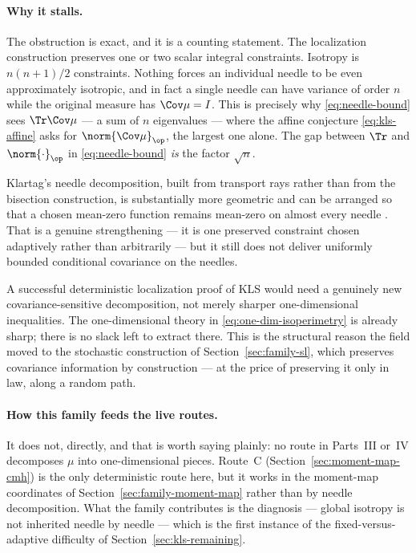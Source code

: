 \documentclass[../../main.tex]{subfiles}
\begin{document}
\paragraph{Why it stalls.}
The obstruction is exact, and it is a counting statement. The localization construction preserves
one or two scalar integral constraints. Isotropy is $n(n+1)/2$ constraints. Nothing forces an
individual needle to be even approximately isotropic, and in fact a single needle can have
variance of order $n$ while the original measure has $\Cov\mu=I$. This is precisely why
\eqref{eq:needle-bound} sees $\Tr\Cov\mu$ --- a sum of $n$ eigenvalues --- where the affine
conjecture \eqref{eq:kls-affine} asks for $\norm{\Cov\mu}_\op$, the largest one alone. The gap
between $\Tr$ and $\norm{\cdot}_\op$ in \eqref{eq:needle-bound} \emph{is} the factor $\sqrt n$.

Klartag's needle decomposition, built from transport rays rather than from the bisection
construction, is substantially more geometric and can be arranged so that a chosen mean-zero
function remains mean-zero on almost every needle \cite{Klartag2014Needle}. That is a genuine
strengthening --- it is one preserved constraint chosen adaptively rather than arbitrarily --- but
it still does not deliver uniformly bounded conditional covariance on the needles.

\begin{remark}
\label{rem:needle-requirement}
A successful deterministic localization proof of KLS would need a genuinely new
covariance-sensitive decomposition, not merely sharper one-dimensional inequalities. The
one-dimensional theory in \eqref{eq:one-dim-isoperimetry} is already sharp; there is no slack left
to extract there. This is the structural reason the field moved to the stochastic construction of
Section~\ref{sec:family-sl}, which preserves covariance information by construction --- at the
price of preserving it only in law, along a random path.
\end{remark}

\paragraph{How this family feeds the live routes.}
It does not, directly, and that is worth saying plainly: no route in Parts~III or~IV decomposes
$\mu$ into one-dimensional pieces. Route~C (Section~\ref{sec:moment-map-cmh}) is the only
deterministic route here, but it works in the moment-map coordinates of
Section~\ref{sec:family-moment-map} rather than by needle decomposition. What the family
contributes is the diagnosis --- global isotropy is not inherited needle by needle --- which is
the first instance of the fixed-versus-adaptive difficulty of Section~\ref{sec:kls-remaining}.
\end{document}
